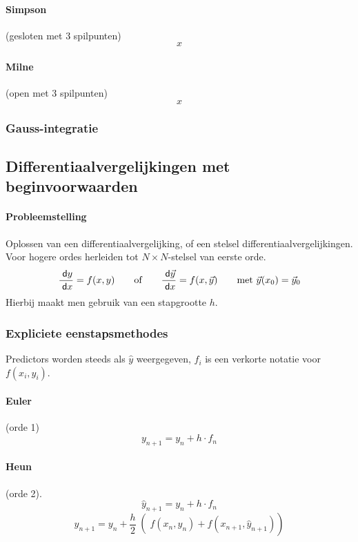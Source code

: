 \paragraph{Simpson} (gesloten met 3 spilpunten)
\[
  x
\]


\paragraph{Milne} (open met 3 spilpunten)
\[
x
\]

\subsubsection{Gauss-integratie}


\subsection{Differentiaalvergelijkingen met beginvoorwaarden}
\label{sec:DiffVglnNum}

\paragraph{Probleemstelling} Oplossen van een differentiaalvergelijking,
of een stelsel differentiaalvergelijkingen. Voor hogere ordes herleiden tot $N \times N$-stelsel van eerste orde.
\[
  \frac{\;\textsf{d}y}{\;\textsf{d}x} = f(x, y)
  \qquad
  \mbox{of}
  \qquad
  \frac{\;\textsf{d}\vec{y}}{\;\textsf{d}x} = f(x, \vec{y})
  \qquad
  \mbox{met }
  \vec{y}(x_0) = \vec{y}_0
\]
Hierbij maakt men gebruik van een stapgrootte $h$.

\subsubsection{Expliciete eenstapsmethodes}
Predictors worden steeds als $\hat{y}$ weergegeven, $f_i$ is een verkorte notatie voor $f(x_i,y_i)$.

\paragraph{Euler} (orde 1)
\[
  y_{n+1} = y_n + h \cdot f_n
\]

\paragraph{Heun} (orde 2).
\[
  \hat{y}_{n+1} = y_n + h \cdot f_n
\]
\[
  y_{n+1} = y_n + \left.\left. \frac{h}{2}\right(f(x_n,y_n) + f(x_{n+1},\hat{y}_{n+1}) \right)
\]

